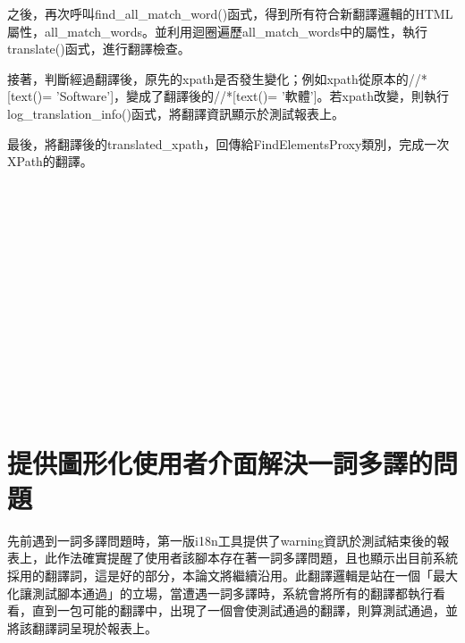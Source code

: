 之後，再次呼叫find\_all\_match\_word()函式，得到所有符合新翻譯邏輯的HTML屬性，all\_match\_words。並利用迴圈遍歷all\_match\_words中的屬性，執行translate()函式，進行翻譯檢查。
	
接著，判斷經過翻譯後，原先的xpath是否發生變化；例如xpath從原本的//*[text()= 'Software']，變成了翻譯後的//*[text()= '軟體']。若xpath改變，則執行log\_translation\_info()函式，將翻譯資訊顯示於測試報表上。

最後，將翻譯後的translated\_xpath，回傳給FindElementsProxy類別，完成一次XPath的翻譯。

\hspace*{\fill} \\
\\ \hspace*{\fill} \\
\\ \hspace*{\fill} \\
\\ \hspace*{\fill} \\
\\ \hspace*{\fill} \\
\\ \hspace*{\fill} \\
\\ \hspace*{\fill} \\
\section{提供圖形化使用者介面解決一詞多譯的問題}
先前遇到一詞多譯問題時，第一版i18n工具提供了warning資訊於測試結束後的報表上，此作法確實提醒了使用者該腳本存在著一詞多譯問題，且也顯示出目前系統採用的翻譯詞，這是好的部分，本論文將繼續沿用。此翻譯邏輯是站在一個「最大化讓測試腳本通過」的立場，當遭遇一詞多譯時，系統會將所有的翻譯都執行看看，直到一包可能的翻譯中，出現了一個會使測試通過的翻譯，則算測試通過，並將該翻譯詞呈現於報表上。

